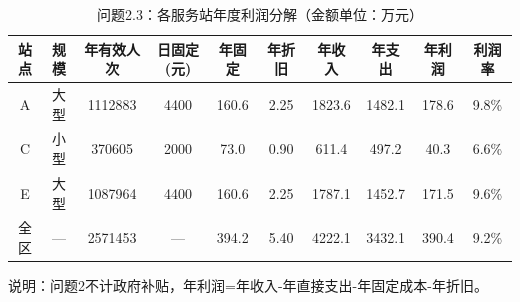 \begin{table}[htbp]
\centering
\caption{问题2.3：各服务站年度利润分解（金额单位：万元）}
\begin{tabular}{|c|c|c|c|c|c|c|c|c|c|}
\hline
站点 & 规模 & 年有效人次 & 日固定(元) & 年固定 & 年折旧 & 年收入 & 年支出 & 年利润 & 利润率 \\
\hline
A & 大型 & 1112883 & 4400 & 160.6 & 2.25 & 1823.6 & 1482.1 & 178.6 & 9.8\% \\
C & 小型 & 370605 & 2000 & 73.0 & 0.90 & 611.4 & 497.2 & 40.3 & 6.6\% \\
E & 大型 & 1087964 & 4400 & 160.6 & 2.25 & 1787.1 & 1452.7 & 171.5 & 9.6\% \\
\hline
全区 & — & 2571453 & — & 394.2 & 5.40 & 4222.1 & 3432.1 & 390.4 & 9.2\% \\
\hline
\end{tabular}
\vspace{0.2cm}
说明：问题2不计政府补贴，年利润=年收入-年直接支出-年固定成本-年折旧。
\end{table}

